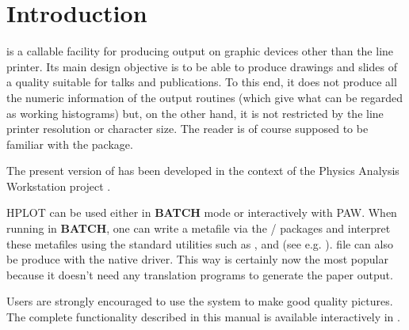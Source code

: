 \chapter{Introduction}

\HPLOT{} is a \FORTRAN{} callable facility for producing \HBOOK\cite{bib-HBOOK}
output on graphic devices other than the line printer. Its main design objective
is to be able to produce drawings and slides of a quality suitable for talks and
publications. To this end, it does not produce all the numeric information of
the \HBOOK{} output routines (which give what can be regarded as working
histograms) but, on the other hand, it is not restricted by the line printer
resolution or character size. The reader is of course supposed to be familiar
with the \HBOOK{} package.

The present version of \HPLOT{} has been developed in the context of the Physics
Analysis Workstation project \PAW\cite{bib-PAW}.

HPLOT can be used either in {\bf BATCH} mode or interactively with PAW. When
running in {\bf BATCH}, one can write a metafile via the \HIGZ{}/\GKS{} packages
and interpret these metafiles using the standard utilities such as
,  and 
(see e.g. \cite{bib-GKS1,bib-GKS2}). \PS{} file can also be produce with the
native \HIGZ{} \PS{} driver. This way is certainly now the most popular because
it doesn't need any translation programs to generate the paper output.

Users are strongly encouraged to use the \PAW{} system to make good quality
pictures. The complete \HPLOT{} functionality described in this manual is
available interactively in \PAW.



